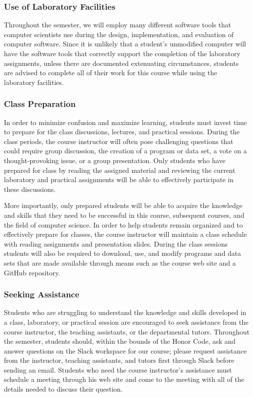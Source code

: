 \documentclass[11pt]{article}
\newcommand{\instructorpronoun}[1]{his}
\begin{document}
\subsubsection*{Use of Laboratory Facilities}

Throughout the semester, we will employ many different software tools that
computer scientists use during the design, implementation, and evaluation of
computer software. Since it is unlikely that a student's unmodified computer
will have the software tools that correctly support the completion of the
laboratory assignments, unless there are documented extenuating circumstances,
students are advised to complete all of their work for this course while using
the laboratory facilities.

\vspace*{-.1in}

\subsubsection*{Class Preparation}

In order to minimize confusion and maximize learning, students must invest time
to prepare for the class discussions, lectures, and practical sessions. During
the class periods, the course instructor will often pose challenging questions
that could require group discussion, the creation of a program or data set, a
vote on a thought-provoking issue, or a group presentation. Only students who
have prepared for class by reading the assigned material and reviewing the
current laboratory and practical assignments will be able to effectively
participate in these discussions.

More importantly, only prepared students will be able to acquire the knowledge
and skills that they need to be successful in this course, subsequent courses,
and the field of computer science. In order to help students remain organized
and to effectively prepare for classes, the course instructor will maintain a
class schedule with reading assignments and presentation slides. During the
class sessions students will also be required to download, use, and modify
programs and data sets that are made available through means such as the course
web site and a GitHub repository.

\subsubsection*{Seeking Assistance}

Students who are struggling to understand the knowledge and skills developed in
a class, laboratory, or practical session are encouraged to seek assistance from
the course instructor, the teaching assistants, or the departmental tutors.
Throughout the semester, students should, within the bounds of the Honor Code,
ask and answer questions on the Slack workspace for our course; please request
assistance from the instructor, teaching assistants, and tutors first through
Slack before sending an email. Students who need the course instructor's
assistance must schedule a meeting through \instructorpronoun{} web site and
come to the meeting with all of the details needed to discuss their question.
\end{document}
